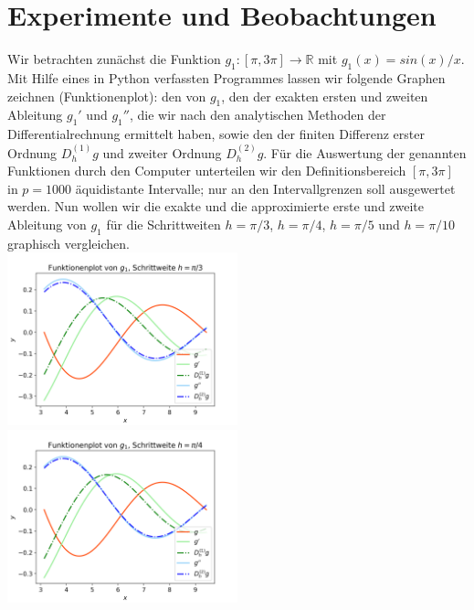 \documentclass{scrartcl}
\begin{document}
\pagebreak \section{Experimente und Beobachtungen}
\label{sec:experimente}

Wir betrachten zunächst die Funktion $g_1:[\pi, 3\pi] \rightarrow \mathbb{R}$ mit $g_1(x) = sin(x)/x$. Mit Hilfe eines in Python verfassten Programmes lassen wir folgende Graphen zeichnen (Funktionenplot): den von $g_1$, den der exakten ersten und zweiten Ableitung $g_1'$ und $g_1''$, die wir nach den analytischen Methoden der Differentialrechnung ermittelt haben, sowie den der finiten Differenz erster Ordnung $D_h^{(1)}g$ und zweiter Ordnung $D_h^{(2)}g$. Für die Auswertung der genannten Funktionen durch den Computer unterteilen wir den Definitionsbereich $[\pi, 3\pi]$ in $p = 1000$ äquidistante Intervalle; nur an den Intervallgrenzen soll ausgewertet werden. Nun wollen wir die exakte und die approximierte erste und zweite Ableitung von $g_1$ für die Schrittweiten $h = \pi/3$, $h = \pi/4$, $h = \pi/5$ und $h = \pi/10$ graphisch vergleichen. \\
\includegraphics[width=0.5\textwidth]{Grafiken/Funktionenplot_Pi_Drittel} \includegraphics[width=0.5\textwidth]{Grafiken/Funktionenplot_Pi_Viertel}\\
\end{document}

